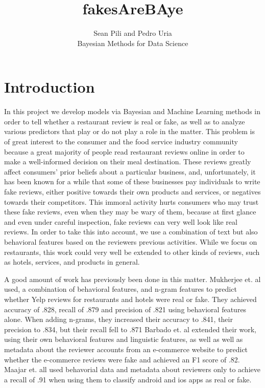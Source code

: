 \documentclass[man, floatsintext, 10pt]{apa6}
\title{fakesAreBAye}
\author{Sean Pili and Pedro Uria \\ Bayesian Methods for Data Science}
\affiliation{GWU}
\begin{document}
\maketitle

\section{Introduction}

In this project we develop models via Bayesian and Machine Learning methods in order to tell whether a restaurant review is real or fake, as well as to analyze various predictors that play or do not play a role in the matter. This problem is of great interest to the consumer and the food service industry community because a great majority of people read restaurant reviews online in order to make a well-informed decision on their meal destination. These reviews greatly affect consumers' prior beliefs about a particular business, and, unfortunately, it has been known for a while that some of these businesses pay individuals to write fake reviews, either positive towards their own products and services, or negatives towards their competitors. This immoral activity hurts consumers who may trust these fake reviews, even when they may be wary of them, because at first glance and even under careful inspection, fake reviews can very well look like real reviews. In order to take this into account, we use a combination of text but also behavioral features based on the reviewers previous activities.  While we focus on restaurants, this work could very well be extended to other kinds of reviews, such as hotels, services, and products in general.

A good amount of work has previously been done in this matter. Mukherjee et. al used, a combination of  behavioral features, and n-gram features to predict whether Yelp reviews for restaurants and hotels were real or fake.  They achieved accuracy of .828, recall of .879 and precision of .821 using behavioral features alone. When adding n-grams, they increased their accuracy to .841, their precision to .834, but their recall fell to .871 Barbado et. al  extended their work, using their own behavioral features and linguistic features, as well as well as metadata about the reviewer accounts from an e-commerce website to predict whether the e-commerce reviews were fake and achieved an F1 score of .82. Maajar et. all used behavorial data and metadata about reviewers only to achieve a recall of .91 when using them to classify android and ios apps as real or fake. 
\end{document}
